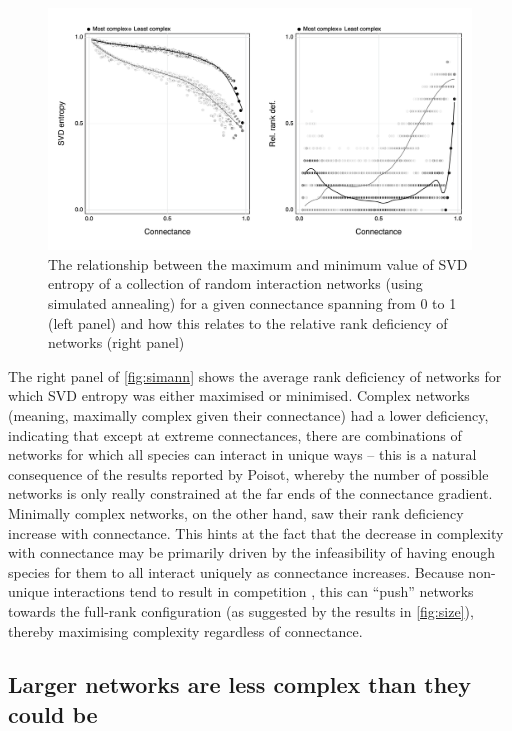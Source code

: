 \begin{figure}[h]
    \centering
    \includegraphics[width=\textwidth]{figures/minmax_combined.png}
    \caption{The relationship between the maximum and minimum value of SVD
entropy of a collection of random interaction networks (using simulated
annealing) for a given connectance spanning from 0 to 1 (left panel) and how
this relates to the relative rank deficiency of networks (right panel)}
    \label{fig:simann}
\end{figure}

The right panel of \autoref{fig:simann} shows the average rank deficiency of
networks for which SVD entropy was either maximised or minimised. Complex
networks (meaning, maximally complex given their connectance) had a lower
deficiency, indicating that except at extreme connectances, there are
combinations of networks for which all species can interact in unique ways --
this is a natural consequence of the results reported by
Poisot\cite{Poisot2014WheEco}, whereby the number of possible networks is only
really constrained at the far ends of the connectance gradient. Minimally
complex networks, on the other hand, saw their rank deficiency increase with
connectance. This hints at the fact that the decrease in complexity with
connectance may be primarily driven by the infeasibility of having enough
species for them to all interact uniquely as connectance increases. Because
non-unique interactions tend to result in competition
\cite{Bascompte2007PlaMut}, this can ``push'' networks towards the full-rank
configuration (as suggested by the results in \autoref{fig:size}), thereby
maximising complexity regardless of connectance.

\subsection{Larger networks are less complex than they could
be}\label{larger-networks-are-less-complex-than-they-could-be}

